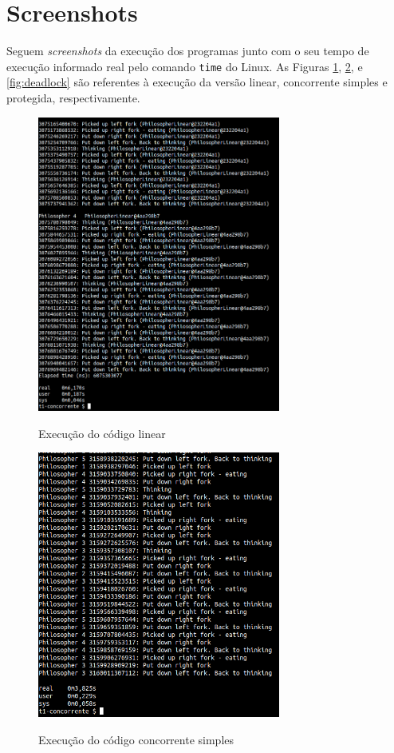 \documentclass[conference]{IEEEtran}
\begin{document}
\section{Screenshots}

Seguem \textit{screenshots} da execução dos programas junto com o seu tempo de execução informado real pelo comando \verb|time| do Linux. As Figuras \ref{fig:linear}, \ref{fig:concorrente}, e \ref{fig:deadlock} são referentes à execução da versão linear, concorrente simples e protegida, respectivamente.

\begin{figure}[h!]
\caption{Execução do código linear}
\centering
\includegraphics[width=8cm]{lin}
\label{fig:linear}
\end{figure}

\begin{figure}[h!]
\caption{Execução do código concorrente simples}
\centering
\includegraphics[width=8cm]{con}
\label{fig:concorrente}
\end{figure}
\end{document}
